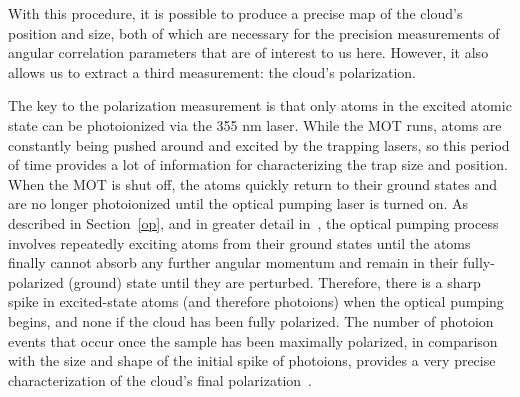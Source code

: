 With this procedure, it is possible to produce a precise map of the cloud's position and size, both of which are necessary for the precision measurements of angular correlation parameters that are of interest to us here.  However, it also allows us to extract a third measurement:  the cloud's polarization.

The key to the polarization measurement is that only atoms in the excited atomic state can be photoionized via the 355 nm laser.  While the MOT runs, atoms are constantly being pushed around and excited by the trapping lasers, so this period of time provides a lot of information for characterizing the trap size and position.  When the MOT is shut off, the atoms quickly return to their ground states and are no longer photoionized until the optical pumping laser is turned on.  As described in Section~\ref{op}, and in greater detail in~\cite{ben_OP}, the optical pumping process involves repeatedly exciting atoms from their ground states until the atoms finally cannot absorb any further angular momentum and remain in their fully-polarized (ground) state until they are perturbed.  Therefore, there is a sharp spike in excited-state atoms (and therefore photoions) when the optical pumping begins, and none if %
the cloud has been fully polarized.  The number of photoion events that occur once the sample has been maximally polarized, in comparison with the size and shape of the initial spike of photoions, provides a very precise characterization of the cloud's final polarization~\cite{ben_OP}.



